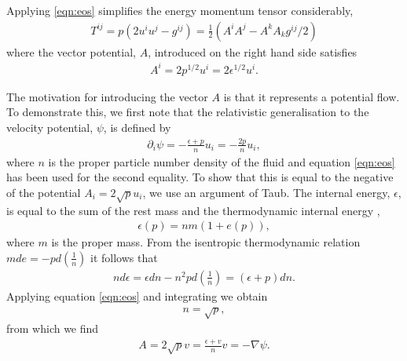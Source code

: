 \documentclass[10pt, fleqn,final,showtrims,oldfontcommands, article,a4paper,oneside]{memoir} %
\newcommand{\eqal}[2]{\begin{align}#1\label{eqn:#2}\end{align}}
\newcommand{\eqnref}[1]{\ref{eqn:#1}}
\newcommand{\lr}[1]{\left( #1 \right)}
\renewcommand{\d}{\partial}
\newcommand{\del}{\nabla}
\newcommand{\half}{\tfrac{1}{2}}
\begin{document}
Applying \eqnref{eos} simplifies the energy momentum tensor considerably,
\eqal{
  T^{i j}  = p\lr{2 u^i u^j - g^{i j}} = \half \lr{ A^i A^j - A^k A_k g^{i j}/2} 
}{EMFluid}
where the vector potential, $A$, introduced on the right hand side satisfies
\eqal{
  A^i = 2p^{1/2}u^i =2 \epsilon^{1/2} u^i.
}{defnA}

The motivation for introducing the vector $A$ is that it represents a potential flow.
To demonstrate this, we first note that the relativistic generalisation to the velocity potential, $\psi$,  is defined by\cite{LandauBook}
\begin{align}
  \d_i \psi = - \frac{\epsilon+p}{n} u_i = - \frac{2 p}{n} u_i,
\end{align}
where $n$ is the proper particle number density of the fluid and equation \eqnref{eos} has been used for the second equality.
To show that this is equal to the negative of the potential $A_i = 2\sqrt p u_i$, we use an argument of Taub\cite{Taub1978}.
The internal energy, $\epsilon$, is equal to the sum of the rest mass and the thermodynamic internal energy \cite{LandauBook, Doran2003},
\begin{align}
  \epsilon(p) = nm( 1 + e(p)),
\end{align}
where $m$ is the proper mass.
From the isentropic thermodynamic relation $m de = - p d\lr{\frac{1}{n}}$
it follows that 
\begin{align}
 n d\epsilon = \epsilon dn - n^2 p d \lr{\frac{1}{n}} = \lr{\epsilon + p} dn.
\end{align}
Applying equation \eqnref{eos} and integrating we obtain
\begin{align}
n = \sqrt p,
\end{align}
from which we find
\begin{align}
A = 2\sqrt p  v = \frac{\epsilon + v}{n} v = - \del \psi.
\label{eqn:AisPotFlow}
\end{align}
\end{document}
